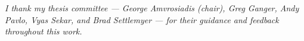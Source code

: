 



{\normalsize
  \noindent \emph{I thank my thesis committee --- George Amvrosiadis (chair), Greg Ganger, Andy
    Pavlo, Vyas Sekar, and Brad Settlemyer --- for their guidance and feedback throughout this
    work.}
  \par
}

